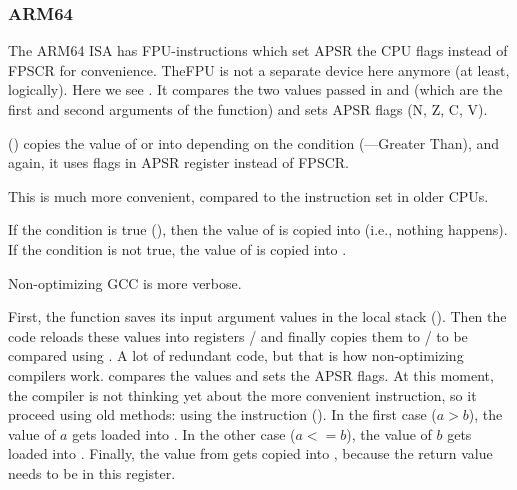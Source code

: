 ﻿\subsubsection{ARM64}




The ARM64 \ac{ISA} has FPU-instructions 
which set \ac{APSR} the CPU flags instead of \ac{FPSCR} for convenience.
The\ac{FPU} is not a separate device here anymore (at least, logically).
Here we see . It compares the two values passed in  and  (which are the first and second arguments of the function)
and sets \ac{APSR} flags (N, Z, C, V).

 () copies the value of  or  into  depending on the condition (---Greater Than),
and again, it uses flags in \ac{APSR} register instead of \ac{FPSCR}.

This is much more convenient, compared to the instruction set in older CPUs.

If the condition is true (), then the value of  
is copied into  (i.e., nothing happens).
If the condition is not true, the value of  
is copied into .




Non-optimizing GCC is more verbose.

First, the function saves its input argument values in the local stack ().
Then the code reloads these values into registers
/ and finally copies them to 
/ to be compared using . 
A lot of redundant code, 
but that is how non-optimizing compilers work.
 compares the values and sets the \ac{APSR} flags.
At this moment, 
the compiler is not thinking yet about the more convenient  instruction, so it proceed using old methods: 
using the  instruction ().
In the first case ($a>b$), the value of $a$ gets loaded 
into .
In the other case ($a<=b$), the value of $b$ gets loaded into 
.
Finally, the value from  gets copied into , 
because the return value needs to be in this 
register.

